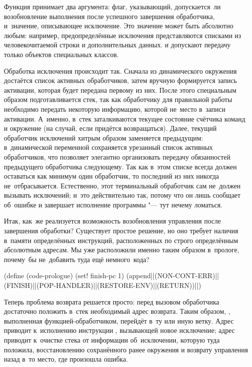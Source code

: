 Функция  принимает два аргумента: флаг, указывающий,
допускается~ли возобновление выполнения после успешного завершения обработчика,
и~значение, описывающее исключение. Это значение может быть абсолютно любым:
например, предопределённые исключения представляются списками из
человекочитаемой строки и дополнительных данных. {\CommonLisp} и {\EuLisp}
допускают передачу только объектов специальных классов.

Обработка исключения происходит так. Сначала из динамического окружения
достаётся список активных обработчиков, затем вручную формируется запись
активации, которая будет передана первому из них. После этого специальным
образом подготавливается стек, так как обработчику для правильной работы
необходимо передать некоторую информацию, которой не~место в~записи активации.
А~именно, в~стек заталкиваются текущее состояние счётчика команд и окружение (на
случай, если придётся возвращаться). Далее, текущий обработчик исключений хитрым
образом заменяется предыдущим: в~динамической переменной сохраняется урезанный
список активных обработчиков, что позволяет элегантно организовать передачу
обязанностей предыдущего обработчика следующему. Так как в~этом списке всегда
должен оставаться как минимум один обработчик, то последний из них никогда
не~отбрасывается. Естественно, этот терминальный обработчик сам не~должен
вызывать исключений; и~это действительно так, потому что он лишь сообщает
об~ошибке и завершает исполнение программы "--- тут нечему ломаться.

Итак, как~же реализуется возможность возобновления управления после завершения
обработки? Существует простое решение, но оно требует наличия в~памяти
определённых инструкций, расположенных по строго определённым абсолютным
адресам. Мы уже расположили  именно таким образом в~прологе,
почему~бы не~добавить туда ещё немного~кода?

{\def\/{\ic{\,\,}}%
\begin{code:lisp}
(define (code-prologue)
  (set! finish-pc 1)
  (append|\/|(NON-CONT-ERR)|\:|(FINISH)|\:|(POP-HANDLER)|\:|(RESTORE-ENV)|\:|(RETURN))|\/|)
\end{code:lisp}}

Теперь проблема возврата решается просто: перед вызовом обработчика достаточно
положить в~стек необходимый адрес возврата. Таким образом, ,
выполненная функцией-обработчиком, перейдёт в~ту или иную ветку. Адрес~
приводит к~исполнению инструкции , вызывающей новое исключение;
адрес~ приводит к~очистке стека от информации об~исключении, которую
 туда положила, восстановлению сохранённого ранее окружения
и возврату управления назад в~то место, где произошла ошибка.

